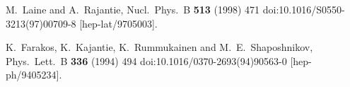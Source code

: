 \documentclass[11pt,a4paper]{article}
\begin{document}
\begin{thebibliography}{*}
  M.~Laine and A.~Rajantie,
  Nucl.\ Phys.\ B {\bf 513} (1998) 471
  doi:10.1016/S0550-3213(97)00709-8
  [hep-lat/9705003].


  K.~Farakos, K.~Kajantie, K.~Rummukainen and M.~E.~Shaposhnikov,
  Phys.\ Lett.\ B {\bf 336} (1994) 494
  doi:10.1016/0370-2693(94)90563-0
  [hep-ph/9405234].


\end{thebibliography}
\end{document}
